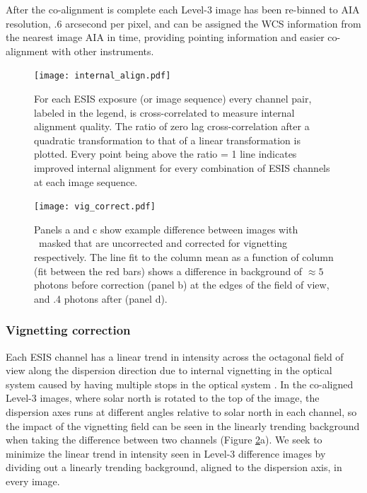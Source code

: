         After the co-alignment is complete each Level-3 image has been re-binned to AIA resolution, .6 arcsecond per pixel, and can be assigned the WCS information \citep{WCS} from the nearest image AIA in time, providing pointing information and easier co-alignment with other instruments.
    	

    	
     	\begin{figure}[htb!]
    		\centering
    		\texttt{[image: internal\_align.pdf]}
    		\caption{ For each ESIS exposure (or image sequence) every channel pair, labeled in the legend, is cross-correlated to measure internal alignment quality.  The ratio of zero lag cross-correlation after a quadratic transformation to that of a linear transformation is plotted.  Every point being above the ratio = 1 line indicates improved internal alignment for every combination of ESIS channels at each image sequence.}
    		\label{fig:cc}	
    	\end{figure}
    	
 		\begin{figure}[htb!]
			\centering
			\texttt{[image: vig\_correct.pdf]}
			\caption{Panels a and c show example difference between images with \mgxbright \ masked that are uncorrected and corrected for vignetting respectively.  The line fit to the column mean as a function of column (fit between the red bars) shows a difference in background of $\approx 5$ photons before correction (panel b) at the edges of the field of view, and .4 photons after (panel d). }
			\label{fig:vig_correct}
		\end{figure}

    \subsubsection{Vignetting correction}
  
        Each ESIS channel has a linear trend in intensity across the octagonal field of view along the dispersion direction due to internal vignetting in the optical system caused by having multiple stops in the optical system \citep{ESIS}.
        In the co-aligned Level-3 images, where solar north is rotated to the top of the image, the dispersion axes runs at different angles relative to solar north in each channel, so the impact of the vignetting field can be seen in the linearly trending background when taking the difference between two channels (Figure \ref{fig:vig_correct}a).
        We seek to minimize the linear trend in intensity seen in Level-3 difference images by dividing out a linearly trending background, aligned to the dispersion axis, in every image.
        
